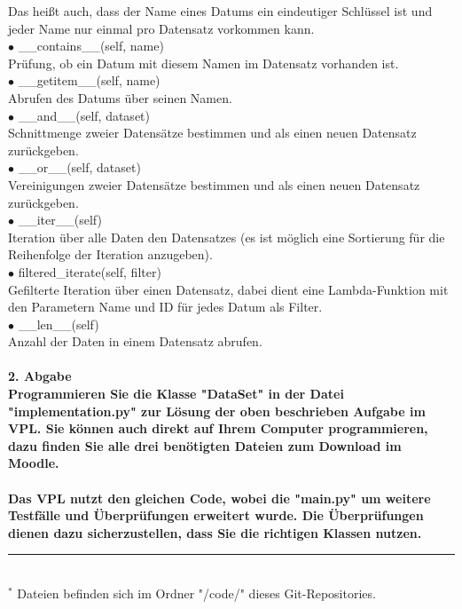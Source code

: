 \documentclass[]{article}
\begin{document}
\hspace*{1cm} Das heißt auch, dass der Name eines Datums ein eindeutiger Schlüssel ist und jeder Name nur einmal pro Datensatz vorkommen kann.\\
$\bullet$ \_\_contains\_\_(self, name)\\
\hspace*{1cm} Prüfung, ob ein Datum mit diesem Namen im Datensatz vorhanden ist.\\
$\bullet$ \_\_getitem\_\_(self, name)\\
\hspace*{1cm} Abrufen des Datums über seinen Namen.\\ 
$\bullet$ \_\_and\_\_(self, dataset)\\
\hspace*{1cm} Schnittmenge zweier Datensätze bestimmen und als einen neuen Datensatz zurückgeben.\\
$\bullet$ \_\_or\_\_(self, dataset)\\
\hspace*{1cm} Vereinigungen zweier Datensätze bestimmen und als einen neuen Datensatz zurückgeben.\\
$\bullet$ \_\_iter\_\_(self)\\
\hspace*{1cm} Iteration über alle Daten den Datensatzes (es ist möglich eine Sortierung für die Reihenfolge der Iteration anzugeben).\\ 
$\bullet$ filtered\_iterate(self, filter)\\
\hspace*{1cm} Gefilterte Iteration über einen Datensatz, dabei dient eine Lambda-Funktion mit den Parametern Name und ID für jedes Datum als Filter.\\
$\bullet$ \_\_len\_\_(self)\\
\hspace*{1cm} Anzahl der Daten in einem Datensatz abrufen.\\
\\
\bf \large 2. Abgabe \normalsize \normalfont\\[0.5cm]
Programmieren Sie die Klasse "DataSet" in der Datei "implementation.py" zur Lösung der oben beschrieben Aufgabe im VPL.
Sie können auch direkt auf Ihrem Computer programmieren, dazu finden Sie alle drei benötigten Dateien zum Download im Moodle.\\
\\
Das VPL nutzt den gleichen Code, wobei die "main.py" um weitere Testfälle und Überprüfungen erweitert wurde.
Die Überprüfungen dienen dazu sicherzustellen, dass Sie die richtigen Klassen nutzen.\\
%
\hrule\hfill\\[0.2cm]
$^*$ Dateien befinden sich im Ordner "/code/" dieses Git-Repositories.\\
\end{document}
